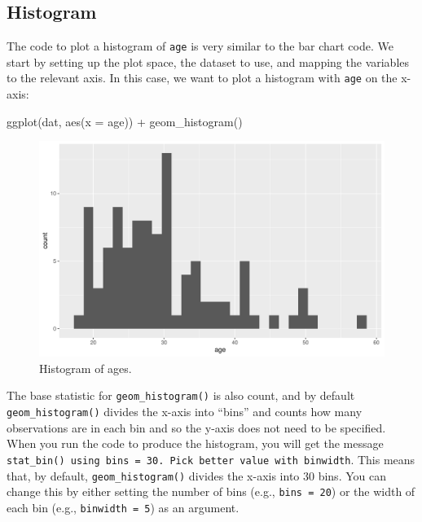 \documentclass[
  english,
  doc,floatsintext]{apa6}
\newenvironment{Shaded}{\begin{snugshade}}{\end{snugshade}}
\newcommand{\AttributeTok}[1]{\textcolor[rgb]{0.77,0.63,0.00}{#1}}
\newcommand{\FunctionTok}[1]{\textcolor[rgb]{0.00,0.00,0.00}{#1}}
\newcommand{\NormalTok}[1]{#1}
\newcommand{\SpecialCharTok}[1]{\textcolor[rgb]{0.00,0.00,0.00}{#1}}
\begin{document}
\hypertarget{histogram}{%
\subsection{Histogram}\label{histogram}}

The code to plot a histogram of \texttt{age} is very similar to the bar chart code. We start by setting up the plot space, the dataset to use, and mapping the variables to the relevant axis. In this case, we want to plot a histogram with \texttt{age} on the x-axis:

\begin{Shaded}
\begin{Highlighting}[]
\FunctionTok{ggplot}\NormalTok{(dat, }\FunctionTok{aes}\NormalTok{(}\AttributeTok{x =}\NormalTok{ age)) }\SpecialCharTok{+}
  \FunctionTok{geom\_histogram}\NormalTok{()}
\end{Highlighting}
\end{Shaded}

\begin{figure}

{\centering \includegraphics[width=1\linewidth]{images/histogram1-1} 

}

\caption{Histogram of ages.}\label{fig:histogram1}
\end{figure}

The base statistic for \texttt{geom\_histogram()} is also count, and by default \texttt{geom\_histogram()} divides the x-axis into ``bins'' and counts how many observations are in each bin and so the y-axis does not need to be specified. When you run the code to produce the histogram, you will get the message \texttt{stat\_bin()\ using\ bins\ =\ 30.\ Pick\ better\ value\ with\ binwidth}. This means that, by default, \texttt{geom\_histogram()} divides the x-axis into 30 bins. You can change this by either setting the number of bins (e.g., \texttt{bins\ =\ 20}) or the width of each bin (e.g., \texttt{binwidth\ =\ 5}) as an argument.
\end{document}
